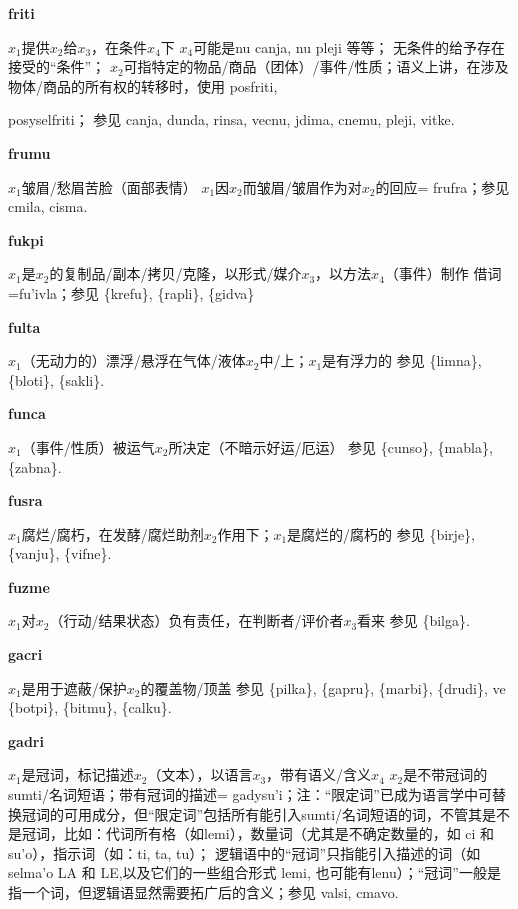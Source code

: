 \documentclass[notitlepage,twocolumn,a4paper,10pt]{book}
\begin{document}
{\sffamily\bfseries friti}\enspace {\ttfamily\bfseries[fit]}  $x_1$提供$x_2$给$x_3$，在条件$x_4$下 \textemdash{} $x_4$可能是nu canja, nu pleji 等等； 无条件的给予存在接受的“条件”； $x_2$可指特定的物品\slash{}商品（团体）\slash{}事件\slash{}性质；语义上讲，在涉及物体\slash{}商品的所有权的转移时，使用 {posfriti}, {posyselfriti； 参见 {canja}, {dunda}, {rinsa}, {vecnu}, {jdima}, {cnemu}, {pleji}, {vitke}.

{\sffamily\bfseries frumu}\enspace {\ttfamily\bfseries[    fru]}  $x_1$皱眉\slash{}愁眉苦脸（面部表情） \textemdash{} $x_1$因$x_2$而皱眉\slash{}皱眉作为对$x_2$的回应= {frufra}；参见 {cmila}, {cisma}.

{\sffamily\bfseries fukpi}\enspace {\ttfamily\bfseries[fuk     fu'i]}  $x_1$是$x_2$的复制品\slash{}副本\slash{}拷贝\slash{}克隆，以形式\slash{}媒介$x_3$，以方法$x_4$（事件）制作 \textemdash{} 借词=fu'ivla；参见 \{krefu\}, \{rapli\}, \{gidva\}

{\sffamily\bfseries fulta}  $x_1$（无动力的）漂浮\slash{}悬浮在气体\slash{}液体$x_2$中\slash{}上；$x_1$是有浮力的 \textemdash{} 参见 \{limna\}, \{bloti\}, \{sakli\}.

{\sffamily\bfseries funca}\enspace {\ttfamily\bfseries[fun     fu'a]}  $x_1$（事件\slash{}性质）被运气$x_2$所决定（不暗示好运\slash{}厄运） \textemdash{} 参见 \{cunso\}, \{mabla\}, \{zabna\}.

{\sffamily\bfseries fusra}\enspace {\ttfamily\bfseries[fur]}  $x_1$腐烂\slash{}腐朽，在发酵\slash{}腐烂助剂$x_2$作用下；$x_1$是腐烂的\slash{}腐朽的 \textemdash{} 参见 \{birje\}, \{vanju\}, \{vifne\}.

{\sffamily\bfseries fuzme}\enspace {\ttfamily\bfseries[fuz     fu'e]}  $x_1$对$x_2$（行动\slash{}结果状态）负有责任，在判断者\slash{}评价者$x_3$看来 \textemdash{} 参见 \{bilga\}.

{\sffamily\bfseries gacri}\enspace {\ttfamily\bfseries[        gai]}  $x_1$是用于遮蔽\slash{}保护$x_2$的覆盖物\slash{}顶盖 \textemdash{} 参见 \{pilka\}, \{gapru\}, \{marbi\}, \{drudi\}, ve \{botpi\}, \{bitmu\}, \{calku\}.

{\sffamily\bfseries gadri}\enspace {\ttfamily\bfseries[gad]}  $x_1$是冠词，标记描述$x_2$（文本），以语言$x_3$，带有语义\slash{}含义$x_4$ \textemdash{} $x_2$是不带冠词的sumti\slash{}名词短语；带有冠词的描述= {gadysu'i}；注：“限定词”已成为语言学中可替换冠词的可用成分，但“限定词”包括所有能引入sumti\slash{}名词短语的词，不管其是不是冠词，比如：代词所有格（如lemi），数量词（尤其是不确定数量的，如 ci 和su'o），指示词（如：ti, ta, tu）； 逻辑语中的“冠词”只指能引入描述的词（如 selma'o LA 和 LE,以及它们的一些组合形式 lemi, 也可能有lenu）；“冠词”一般是指一个词，但逻辑语显然需要拓广后的含义；参见 {valsi}, {cmavo}.

}
\end{document}
